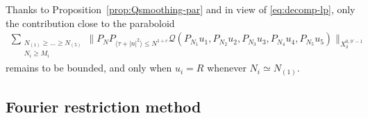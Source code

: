 \documentclass[11pt, xcolor = dvipsnames,reqno
]{amsart}
\theoremstyle{definition}
\theoremstyle{remark}
\begin{document}
Thanks to Proposition~\ref{prop:Qsmoothing-par} and in view of \eqref{eq:decomp-lp}, 
only the contribution close to the paraboloid
\begin{align}\label{eq:decomp-parproj}
    \sum_{\substack{N_{(1)} \geq \ldots\geq N_{(5)} \\ N_i \geq M_i }} \lVert P_N P_{\langle \tau + |n|^2 \rangle \leq N^{1+c}} \mathcal{Q}(P_{N_{1}}u_{1}, P_{N_{2}}u_{2}, P_{N_{3}}u_{3}, P_{N_{4}}u_{4}, P_{N_{5}}u_{5}) \rVert_{X^{0,b'-1}_\delta}
\end{align}
remains to be bounded, and only when $u_i = R$ whenever $N_i \simeq N_{(1)}$. 





\subsection{Fourier restriction method} 
\label{subsec:frm}
\end{document}
